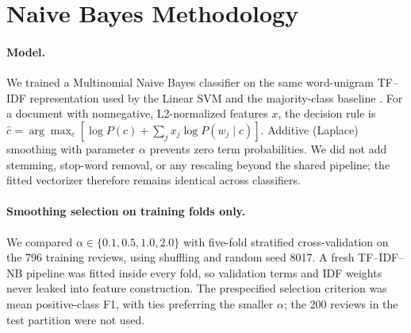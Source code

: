 \section{Naive Bayes Methodology}
\label{sec:nb-method}

\paragraph{Model.}
We trained a Multinomial Naive Bayes classifier \citep{manning2008ir} on the
same word-unigram TF--IDF representation used by the Linear SVM and the
majority-class baseline \citep{pedregosa2011scikit}. For a document with
nonnegative, L2-normalized features $x$, the decision rule is
$\hat{c} = \arg\max_{c} [\log P(c) + \sum_j x_j \log P(w_j \mid c)]$.
Additive (Laplace) smoothing with parameter $\alpha$ prevents zero term
probabilities. We did not add stemming, stop-word removal, or any rescaling
beyond the shared pipeline; the fitted vectorizer therefore remains identical
across classifiers.

\paragraph{Smoothing selection on training folds only.}
We compared $\alpha \in \{0.1, 0.5, 1.0, 2.0\}$ with five-fold stratified
cross-validation on the 796 training reviews, using shuffling and random seed
8017. A fresh TF--IDF--NB pipeline was fitted inside every fold, so validation
terms and IDF weights never leaked into feature construction. The prespecified
selection criterion was mean positive-class F1, with ties preferring the
smaller $\alpha$; the 200 reviews in the test partition were not used.

\begin{table}[t]
  \caption{Training-fold Multinomial NB smoothing comparison (796 reviews,
  five stratified folds, seed 8017). Values are means with population standard
  deviations; these are validation results, not test-set performance.}
  \label{tab:nb-alpha}
  \centering
\end{table}

